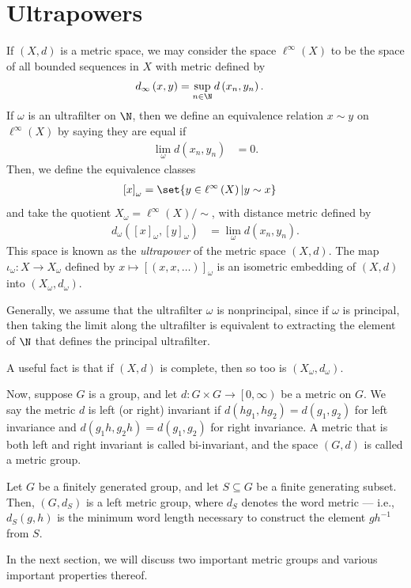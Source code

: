 \documentclass[10pt]{mypackage}
\begin{document}
\RaggedRight
\section{Ultrapowers}%
If $\left( X,d \right)$ is a metric space, we may consider the space $\ell^{\infty}\left( X \right)$ to be the space of all bounded sequences in $X$ with metric defined by
\begin{align*}
  d_{\infty}\left( x,y \right) &= \sup_{n\in \N} d\left( x_n,y_n \right).
\end{align*}
If $\omega$ is an ultrafilter on $\N$, then we define an equivalence relation $x\sim y$ on $\ell^{\infty}\left( X \right)$ by saying they are equal if
\begin{align*}
  \lim_{\omega} d\left( x_n,y_n \right) &= 0.
\end{align*}
Then, we define the equivalence classes
\begin{align*}
  \left[ x \right]_{\omega} &= \set{y\in \ell^{\infty}\left( X \right) | y\sim x}
\end{align*}
and take the quotient $X_{\omega} = \ell^{\infty}\left( X \right)/\sim$, with distance metric defined by
\begin{align*}
  d_{\omega}\left( \left[ x \right]_{\omega},\left[ y \right]_{\omega} \right) &= \lim_{\omega}d\left( x_n,y_n \right).
\end{align*}
This space is known as the \textit{ultrapower} of the metric space $\left( X,d \right)$. The map $\iota_{\omega}\colon X\rightarrow X_{\omega}$ defined by $x\mapsto \left[ \left( x,x,\dots \right) \right]_{\omega}$ is an isometric embedding of $\left( X,d \right)$ into $\left( X_{\omega},d_{\omega} \right)$.

Generally, we assume that the ultrafilter $\omega$ is nonprincipal, since if $\omega$ is principal, then taking the limit along the ultrafilter is equivalent to extracting the element of $\N$ that defines the principal ultrafilter.

A useful fact is that if $\left( X,d \right)$ is complete, then so too is $\left( X_{\omega},d_{\omega} \right)$.

Now, suppose $G$ is a group, and let $d\colon G\times G\rightarrow \left[ 0,\infty \right)$ be a metric on $G$. We say the metric $d$ is left (or right) invariant if $d\left( hg_1,hg_2 \right) = d\left( g_1,g_2 \right)$ for left invariance and $d\left( g_1h,g_2h \right) = d\left( g_1,g_2 \right)$ for right invariance. A metric that is both left and right invariant is called bi-invariant, and the space $\left( G,d \right)$ is called a metric group.
\begin{example}
  Let $G$ be a finitely generated group, and let $S\subseteq G$ be a finite generating subset. Then, $\left( G,d_S \right)$ is a left metric group, where $d_S$ denotes the word metric --- i.e., $d_S\left( g,h \right)$ is the minimum word length necessary to construct the element $gh^{-1}$ from $S$.
\end{example}
In the next section, we will discuss two important metric groups and various important properties thereof.
\end{document}
